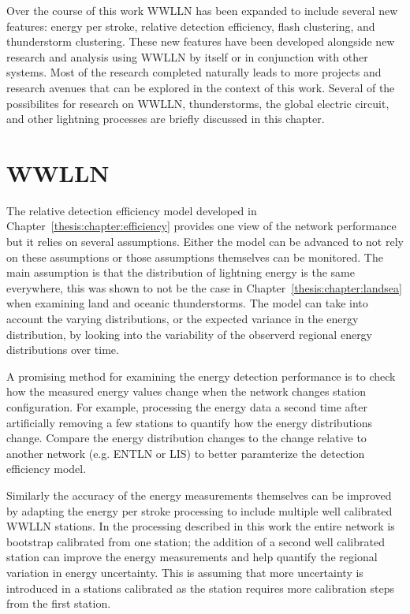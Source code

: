 Over the course of this work WWLLN has been expanded to include several new features: energy per stroke, relative detection efficiency, flash clustering, and thunderstorm clustering.
These new features have been developed alongside new research and analysis using WWLLN by itself or in conjunction with other systems.
Most of the research completed naturally leads to more projects and research avenues that can be explored in the context of this work.
Several of the possibilites for research on WWLLN, thunderstorms, the global electric circuit, and other lightning processes are briefly discussed in this chapter.

\section{WWLLN}

The relative detection efficiency model developed in Chapter~\ref{thesis:chapter:efficiency} provides one view of the network performance but it relies on several assumptions.
Either the model can be advanced to not rely on these assumptions or those assumptions themselves can be monitored.
The main assumption is that the distribution of lightning energy is the same everywhere, this was shown to not be the case in Chapter~\ref{thesis:chapter:landsea} when examining land and oceanic thunderstorms.
The model can take into account the varying distributions, or the expected variance in the energy distribution, by looking into the variability of the observerd regional energy distributions over time.

A promising method for examining the energy detection performance is to check how the measured energy values change when the network changes station configuration.
For example, processing the energy data a second time after artificially removing a few stations to quantify how the energy distributions change.
Compare the energy distribution changes to the change relative to another network (e.g. ENTLN or LIS) to better paramterize the detection efficiency model.

Similarly the accuracy of the energy measurements themselves can be improved by adapting the energy per stroke processing to include multiple well calibrated WWLLN stations.
In the processing described in this work the entire network is bootstrap calibrated from one station; the addition of a second well calibrated station can improve the energy measurements and help quantify the regional variation in energy uncertainty.
This is assuming that more uncertainty is introduced in a stations calibrated as the station requires more calibration steps from the first station.

